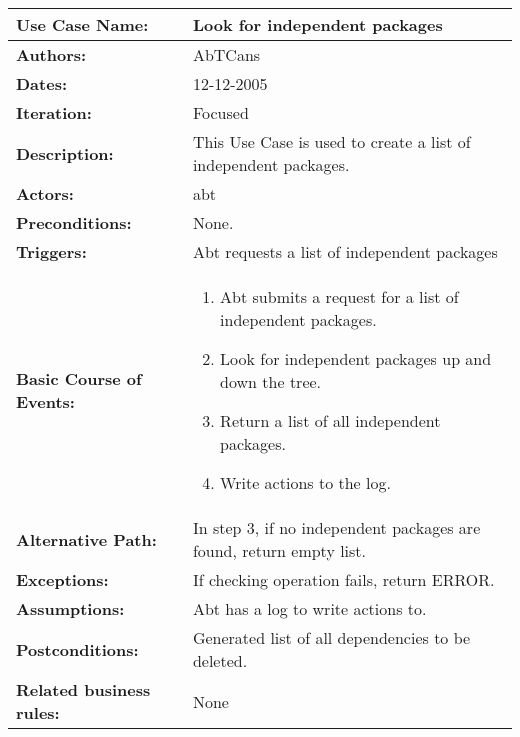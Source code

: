 \begin{tabularx}{\linewidth}{|l|X|}
\hline
\textbf{Use Case Name:} & \textbf{Look for independent packages} \\
\hline
\textbf{Authors:} & AbTCans\\
\hline
\textbf{Dates:} & 12-12-2005\\
\hline
\textbf{Iteration:} & Focused\\
\hline
\textbf{Description:} & This Use Case is used to create a list of independent packages.\\
\hline
\textbf{Actors:} & abt \\ 
\hline
\textbf{Preconditions:} & None.\\
\hline
\textbf{Triggers:} & Abt requests a list of independent packages\\
\hline
\textbf{Basic Course of Events:} & 
\begin{minipage}{\linewidth} 
  \vspace{0.05em}
  \begin{enumerate}
   \item Abt submits a request for a list of independent packages.
   \item Look for independent packages up and down the tree.
   \item Return a list of all independent packages. 
   \item Write actions to the log.
  \end{enumerate}
  \vspace{0.05em}
\end{minipage}
\\
\hline 
\textbf{Alternative Path:} & In step 3, if no independent packages are found, return empty list.\\
\hline
\textbf{Exceptions:} & If checking operation fails, return ERROR.  \\
\hline
\textbf{Assumptions:} & Abt has a log to write actions to.\\
\hline
\textbf{Postconditions:} & Generated list of all dependencies to be deleted.\\
\hline
\textbf{Related business rules:} & None\\
\hline
\end{tabularx}


      